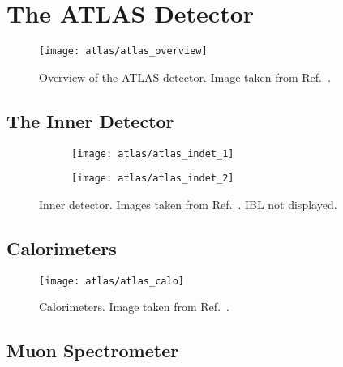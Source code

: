 \section{The ATLAS Detector}

\cite{PERF-2007-01}

\begin{figure}[htbp]
  \centering

  \texttt{[image: atlas/atlas\_overview]}

  \caption{Overview of the ATLAS detector. Image taken from
    Ref.~\cite{Pequenao:1095924}.}%
  \label{fig:atlas_detector_overview}
\end{figure}



\subsection{The Inner Detector}

\begin{figure}[htbp]

  \begin{subfigure}[b]{0.55\textwidth}
    \texttt{[image: atlas/atlas\_indet\_1]}%
    \subcaption{}
  \end{subfigure}\hfill%
  \begin{subfigure}[b]{0.45\textwidth}
    \texttt{[image: atlas/atlas\_indet\_2]}%
    \subcaption{}

  \end{subfigure}

  \caption{Inner detector. Images taken from Ref.~\cite{Pequenao:1095926}. IBL
    not displayed.}
  \label{fig:atlas_inner_detector}
\end{figure}


\subsection{Calorimeters}

\begin{figure}[htbp]
  \centering

  \texttt{[image: atlas/atlas\_calo]}

  \caption{Calorimeters. Image taken from Ref.~\cite{Pequenao:1095927}.}%
  \label{fig:atlas_calorimeters}
\end{figure}


\subsection{Muon Spectrometer}

